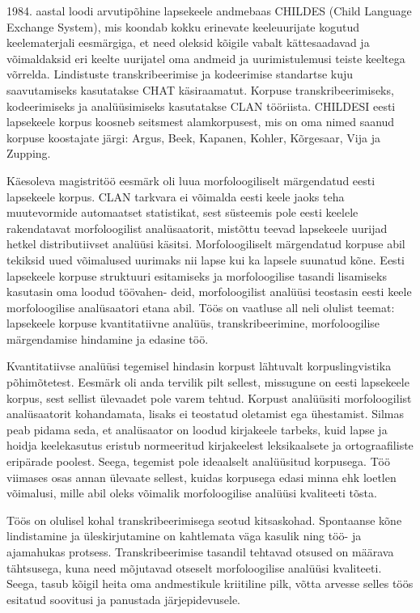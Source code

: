 \documentclass[12pt]{article}
\begin{document}
1984. aastal loodi arvutipõhine lapsekeele andmebaas CHILDES (Child Language Exchange System), mis koondab kokku erinevate keeleuurijate kogutud keelematerjali eesmärgiga, et need oleksid kõigile vabalt kättesaadavad ja võimaldaksid eri keelte uurijatel oma andmeid ja uurimistulemusi teiste keeltega võrrelda. Lindistuste transkribeerimise ja kodeerimise standartse kuju saavutamiseks kasutatakse CHAT käsiraamatut. Korpuse transkribeerimiseks, kodeerimiseks ja analüüsimiseks kasutatakse CLAN tööriista. CHILDESI eesti lapsekeele korpus koosneb seitsmest alamkorpusest, mis on oma nimed saanud korpuse koostajate järgi: Argus, Beek, Kapanen, Kohler, Kõrgesaar, Vija ja Zupping.

Käesoleva magistritöö eesmärk oli luua morfoloogiliselt märgendatud eesti lapsekeele korpus. CLAN tarkvara ei võimalda eesti keele jaoks teha muutevormide automaatset statistikat, sest süsteemis pole eesti keelele rakendatavat morfoloogilist analüsaatorit, mistõttu teevad lapsekeele uurijad hetkel distributiivset analüüsi käsitsi. Morfoloogiliselt märgendatud korpuse abil tekiksid uued võimalused uurimaks nii lapse kui ka lapsele suunatud kõne. Eesti lapsekeele korpuse struktuuri
esitamiseks ja morfoloogilise tasandi lisamiseks kasutasin oma loodud töövahen-
deid, morfoloogilist analüüsi teostasin eesti keele morfoloogilise analüsaatori etana
abil. Töös on vaatluse all neli olulist teemat: lapsekeele korpuse kvantitatiivne analüüs, transkribeerimine, morfoloogilise märgendamise hindamine ja edasine töö.

Kvantitatiivse analüüsi tegemisel hindasin korpust lähtuvalt korpuslingvistika põhimõtetest. Eesmärk oli anda tervilik pilt sellest, missugune on eesti lapsekeele korpus, sest sellist ülevaadet pole varem tehtud. Korpust analüüsiti morfoloogilist analüsaatorit kohandamata, lisaks ei teostatud oletamist ega ühestamist. Silmas peab pidama seda, et analüsaator on loodud kirjakeele tarbeks, kuid lapse ja hoidja keelekasutus eristub normeeritud kirjakeelest leksikaalsete ja ortograafiliste eripärade poolest. Seega, tegemist pole ideaalselt analüüsitud korpusega. Töö viimases osas annan ülevaate sellest, kuidas korpusega edasi minna ehk loetlen võimalusi, mille abil oleks võimalik morfoloogilise analüüsi kvaliteeti tõsta.

Töös on olulisel kohal transkribeerimisega seotud kitsaskohad. Spontaanse kõne lindistamine ja üleskirjutamine on kahtlemata väga kasulik ning töö- ja ajamahukas protsess. Transkribeerimise tasandil tehtavad otsused on määrava tähtsusega, kuna need mõjutavad otseselt morfoloogilise analüüsi kvaliteeti. Seega, tasub kõigil heita oma andmestikule kriitiline pilk, võtta arvesse selles töös esitatud soovitusi ja panustada järjepidevusele.
\end{document}

